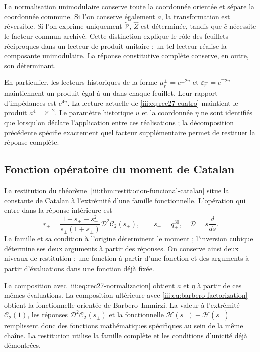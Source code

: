 La normalisation unimodulaire conserve toute la coordonnée orientée et
sépare la coordonnée commune. Si l’on conserve également $a$, la transformation
est réversible. Si l’on exprime uniquement $\widetilde{\mathcal V}$,
$\widehat Z$ est déterminée, tandis que $\widehat c$ nécessite le
facteur commun archivé. Cette distinction explique le rôle des feuillets
réciproques dans un lecteur de produit unitaire : un tel lecteur réalise la
composante unimodulaire. La réponse constitutive complète conserve,
en outre, son déterminant.

En particulier, les lecteurs historiques de la forme
$\mu_r^\pm=e^{\pm2u}$ et $\varepsilon_r^\pm=e^{\mp2u}$
maintiennent un produit égal à un dans chaque feuillet. Leur rapport d’impédances est
$e^{4u}$. La lecture actuelle de \eqref{iii:eq:rec27-cuatro}
maintient le produit $a^4=\widehat c^{-2}$. Le paramètre historique $u$
et la coordonnée $\eta$ ne sont identifiés que lorsqu’on déclare l’application
entre ces réalisations ; la décomposition précédente spécifie
exactement quel facteur supplémentaire permet de restituer la réponse complète.

\subsection{Fonction opératoire du moment de Catalan}

La restitution du théorème~\ref{iii:thm:restitucion-funcional-catalan}
situe la constante de Catalan à l’extrémité d’une famille fonctionnelle.
L’opération qui entre dans la réponse intérieure est
\begin{equation}
 r_\pm=
 \frac{1+s_\pm+s_\pm^2}{s_\pm(1+s_\pm)}
 \mathcal D^2\mathcal C_2(s_\pm),\qquad
 s_\pm=q_\pm^{30},\quad \mathcal D=s\frac{d}{ds}.
 \label{iii:eq:rec27-catalan-operativo}
\end{equation}
La famille et sa condition à l’origine déterminent le moment ;
l’inversion cubique détermine ses deux arguments à partir des réponses.
On conserve ainsi deux niveaux de restitution : une fonction à partir d’une fonction
et des arguments à partir d’évaluations dans une fonction déjà fixée.

La composition avec \eqref{iii:eq:rec27-normalizacion} obtient $a$ et
$\eta$ à partir de ces mêmes évaluations. La composition ultérieure avec
\eqref{iii:eq:barbero-factorization} obtient la fonctionnelle orientée
de Barbero--Immirzi. La valeur à l’extrémité $\mathcal C_2(1)$,
les réponses $\mathcal D^2\mathcal C_2(s_\pm)$ et la fonctionnelle
$\mathcal H(s_-)-\mathcal H(s_+)$ remplissent donc des fonctions
mathématiques spécifiques au sein de la même chaîne. La restitution utilise
la famille complète et les conditions d’unicité déjà démontrées.

